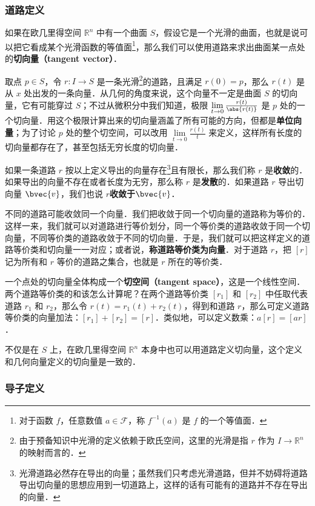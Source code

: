 \subsubsection{道路定义}

如果在欧几里得空间 $\mathbb{R}^n$ 中有一个曲面 $S$，假设它是一个光滑的曲面，也就是说可以把它看成某个光滑函数的等值面\footnote{对于函数 $f$，任意数值 $a\in\mathcal{F}$，称 $f^{-1}(a)$ 是 $f$ 的一个等值面．}，那么我们可以使用道路来求出曲面某一点处的\textbf{切向量（tangent vector）}．

取点 $p\in S$，令 $r:I\rightarrow S$ 是一条光滑\footnote{由于预备知识中光滑的定义依赖于欧氏空间，这里的光滑是指 $r$ 作为 $I\rightarrow\mathbb{R}^n$ 的映射而言的．}的道路，且满足 $r(0)=p$，那么 $r(t)$ 是从 $x$ 处出发的一条向量．从几何的角度来说，这个向量不一定是曲面 $S$ 的切向量，它有可能穿过 $S$；不过从微积分中我们知道，极限 $\lim\limits_{t\rightarrow 0}\frac{r(t)}{\abs{r(t)}}$ 是 $p$ 处的一个切向量．用这个极限计算出来的切向量涵盖了所有可能的方向，但都是\textbf{单位向量}；为了讨论 $p$ 处的整个切空间，可以改用 $\lim\limits_{t\rightarrow 0}\frac{r(t)}{t}$ 来定义，这样所有长度的切向量都存在了，甚至包括无穷长度的切向量．

如果一条道路 $r$ 按以上定义导出的向量存在\footnote{光滑道路必然存在导出的向量；虽然我们只考虑光滑道路，但并不妨碍将道路导出切向量的思想应用到一切道路上，这样的话有可能有的道路并不存在导出的向量．}且有限长，那么我们称 $r$ 是\textbf{收敛}的．如果导出的向量不存在或者长度为无穷，那么称 $r$ 是\textbf{发散}的．如果道路 $r$ 导出切向量 $\bvec{v}$，我们也说 $r$\textbf{收敛于}$\bvec{v}$．

不同的道路可能收敛同一个向量．我们把收敛于同一个切向量的道路称为等价的．这样一来，我们就可以对道路进行等价划分，同一个等价类的道路收敛于同一个切向量，不同等价类的道路收敛于不同的切向量．于是，我们就可以把这样定义的道路等价类和切向量一一对应；或者说，\textbf{称道路等价类为向量}．对于道路 $r$，把 $[r]$ 记为所有和 $r$ 等价的道路之集合，也就是 $r$ 所在的等价类．

一个点处的切向量全体构成一个\textbf{切空间（tangent space）}，这是一个线性空间．两个道路等价类的和该怎么计算呢？在两个道路等价类 $[r_1]$ 和 $[r_2]$ 中任取代表道路 $r_1$ 和 $r_2$，那么令 $r(t)=r_1(t)+r_2(t)$，得到和道路 $r$，那么可定义道路等价类的向量加法：$[r_1]+[r_2]=[r]$．类似地，可以定义数乘：$a[r]=[ar]$．

不仅是在 $S$ 上，在欧几里得空间 $\mathbb{R}^n$ 本身中也可以用道路定义切向量，这个定义和几何向量定义的切向量是一致的．

\subsubsection{导子定义}

